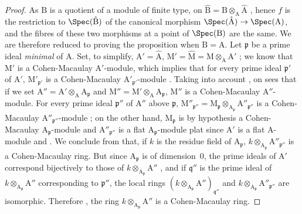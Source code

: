 \begin{proof}
As $\mathrm{B}$ is a quotient of a module of finite type, on $\hat{\mathrm{B}}=\mathrm{B}\otimes_\mathrm{A}\hat{\mathrm{A}}$ , hence $f$ is the restriction to $\Spec(\hat{\mathrm{B}})$ of the canonical morphism $\Spec(\hat{\mathrm{A}})\to\Spec(\mathrm{A})$, and the fibres of these two morphisms at a point of $\Spec(\mathrm{B})$ are the same.
We are therefore reduced to proving the proposition when $\mathrm{B}=\mathrm{A}$.
Let $\mathfrak{p}$ be a prime ideal \emph{minimal} of $\mathrm{A}$.
Set, to simplify, $\mathrm{A}'=\hat{\mathrm{A}}$, $\mathrm{M}'=\hat{\mathrm{M}}=\mathrm{M}\otimes_\mathrm{A}\mathrm{A}'$ ; we know  that $\mathrm{M}'$ is a Cohen-Macaulay $\mathrm{A}'$-module, which implies that for every prime ideal $\mathfrak{p}'$ of $\mathrm{A}'$, $\mathrm{M}'_{\mathfrak{p}'}$ is a Cohen-Macaulay $\mathrm{A}'_{\mathfrak{p}'}$-module .
Taking into account , on sees that if we set $\mathrm{A}''=\mathrm{A}'\otimes_\mathrm{A}\mathrm{A}_\mathfrak{p}$ and $\mathrm{M}''=\mathrm{M}'\otimes_\mathrm{A}\mathrm{A}_\mathfrak{p}$, $\mathrm{M}''$ is a Cohen-Macaulay $\mathrm{A}''$-module.
For every prime ideal $\mathfrak{p}''$ of $\mathrm{A}''$ above $\mathfrak{p}$, $\mathrm{M}''_{\mathfrak{p}''}=\mathrm{M}_\mathfrak{p}\otimes_{\mathrm{A}_\mathfrak{p}}\mathrm{A}''_{\mathfrak{p}''}$ is a Cohen-Macaulay $\mathrm{A}''_{\mathfrak{p}''}$-module ; on the other hand, $\mathrm{M}_\mathfrak{p}$ is by hypothesis a Cohen-Macaulay $\mathrm{A}_\mathfrak{p}$-module and $\mathrm{A}''_{\mathfrak{p}''}$ is a flat $\mathrm{A}_\mathfrak{p}$-module plat since $\mathrm{A}'$ is a flat $\mathrm{A}$-module  and .
We conclude from  that, if $k$ is the residue field of $\mathrm{A}_\mathfrak{p}$, $k\otimes_{\mathrm{A}_\mathfrak{p}}\mathrm{A}''_{\mathfrak{p}''}$ is a Cohen-Macaulay ring.
But since $\mathrm{A}_\mathfrak{p}$ is of dimension~$0$, the prime ideals of $\mathrm{A}'$ correspond bijectively to those of $k\otimes_{\mathrm{A}_\mathfrak{p}}\mathrm{A}''$ , and if $\mathfrak{q}''$ is the prime ideal of $k\otimes_{\mathrm{A}_\mathfrak{p}}\mathrm{A}''$ corresponding to $\mathfrak{p}''$, the local rings $(k\otimes_{\mathrm{A}_\mathfrak{p}}\mathrm{A}'')_{\mathfrak{q}''}$ and $k\otimes_{\mathrm{A}_\mathfrak{p}}\mathrm{A}''_{\mathfrak{p}''}$ are isomorphic.
Therefore , the ring $k\otimes_{\mathrm{A}_\mathfrak{p}}\mathrm{A}''$ is a Cohen-Macaulay ring.
\end{proof}

